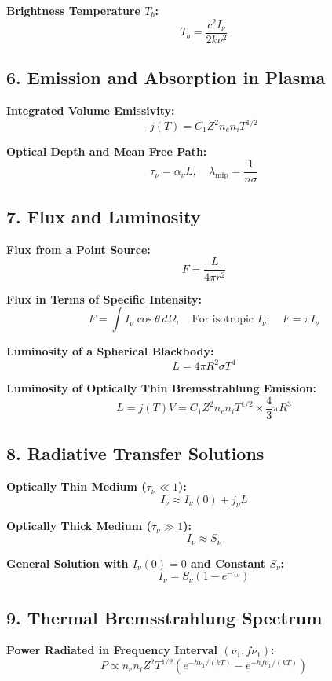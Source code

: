 \documentclass{article}
\begin{document}
\textbf{Brightness Temperature \( T_b \):}
\[
    T_b = \frac{c^2 I_\nu}{2 k \nu^2}
\]

\subsection*{6. Emission and Absorption in Plasma}

\textbf{Integrated Volume Emissivity:}
\[
    j(T) = C_1 Z^2 n_e n_i T^{1/2}
\]

\textbf{Optical Depth and Mean Free Path:}
\[
    \tau_\nu = \alpha_\nu L, \quad \lambda_{\text{mfp}} = \frac{1}{n \sigma}
\]

\subsection*{7. Flux and Luminosity}

\textbf{Flux from a Point Source:}
\[
    F = \frac{L}{4\pi r^2}
\]

\textbf{Flux in Terms of Specific Intensity:}
\[
    F = \int I_\nu \cos \theta \, d\Omega, \quad \text{For isotropic } I_\nu: \quad F = \pi I_\nu
\]

\textbf{Luminosity of a Spherical Blackbody:}
\[
    L = 4\pi R^2 \sigma T^4
\]

\textbf{Luminosity of Optically Thin Bremsstrahlung Emission:}
\[
    L = j(T) V = C_1 Z^2 n_e n_i T^{1/2} \times \frac{4}{3}\pi R^3
\]

\subsection*{8. Radiative Transfer Solutions}

\textbf{Optically Thin Medium (\( \tau_\nu \ll 1 \)):}
\[
    I_\nu \approx I_\nu(0) + j_\nu L
\]

\textbf{Optically Thick Medium (\( \tau_\nu \gg 1 \)):}
\[
    I_\nu \approx S_\nu
\]

\textbf{General Solution with \( I_\nu(0) = 0 \) and Constant \( S_\nu \):}
\[
    I_\nu = S_\nu (1 - e^{-\tau_\nu})
\]

\subsection*{9. Thermal Bremsstrahlung Spectrum}

\textbf{Power Radiated in Frequency Interval \( (\nu_1, f\nu_1) \):}
\[
    P \propto n_e n_i Z^2 T^{1/2} \left( e^{-h\nu_1/(kT)} - e^{-h f\nu_1/(kT)} \right)
\]
\end{document}
